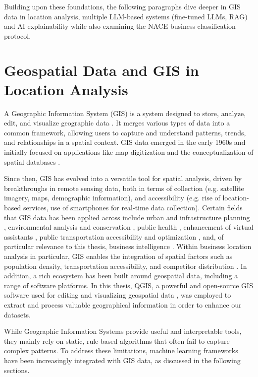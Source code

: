 Building upon these foundations, the following paragraphs dive deeper in GIS data in location analysis, multiple LLM-based systems (fine-tuned LLMs, RAG) and AI explainability while also examining the NACE business classification protocol.


\section{Geospatial Data and GIS in Location Analysis}

A Geographic Information System (GIS) is a system designed
to store, analyze, edit, and visualize geographic data \cite{Data_science_GIS}. It merges various types of data into a common framework, allowing users to capture and understand patterns, trends, and relationships in a spatial context. GIS data emerged in the early 1960s and initially focused on applications like map digitization and the conceptualization of spatial databases \cite{Data_science_GIS}. 

Since then, GIS has evolved into a versatile tool for spatial analysis, driven by breakthroughs in remote sensing data, both in terms of collection (e.g. satellite imagery, maps, demographic information), and accessibility (e.g. rise of location-based services, use of smartphones for real-time data collection). Certain fields that GIS data has been applied across include urban and infrastructure planning \cite{Data_science_GIS}, environmental analysis and conservation \cite{Data_science_GIS}, public health \cite{Epidemiologic_Studies}, enhancement of virtual assistants \cite{virtual_assistants}, public transportation accessibility and optimization \cite{public_transport_metropolitan}, and, of particular relevance to this thesis, business intelligence \cite{satelite_gis}. Within business location analysis in particular, GIS enables the integration of spatial factors such as population density, transportation accessibility, and competitor distribution \cite{gis_business_intelligence_e3s}. In addition, a rich ecosystem has been built around geospatial data, including a range of software platforms. In this thesis, QGIS, a powerful and open-source GIS software used for editing and visualizing geospatial data \cite{QGIS}, was employed to extract and process valuable geographical information in order to enhance our datasets. 

While Geographic Information Systems provide useful and interpretable tools, they mainly rely on static, rule-based algorithms that often fail to capture complex patterns. To address these limitations, machine learning frameworks have been increasingly integrated with GIS data, as discussed in the following sections.



